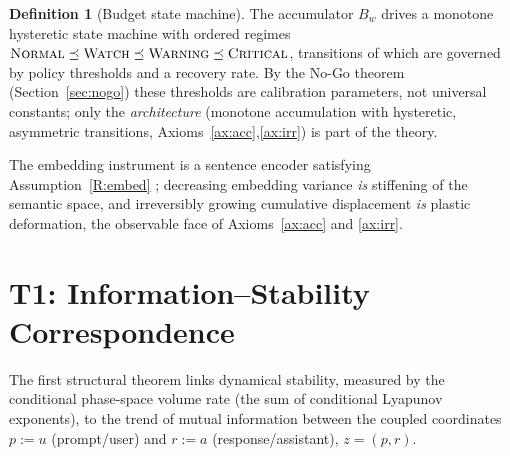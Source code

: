 \documentclass[11pt]{article}
\theoremstyle{plain}
\theoremstyle{definition}
\newtheorem{definition}[theorem]{Definition}
\theoremstyle{remark}
\begin{document}
\begin{definition}[Budget state machine]\label{def:budget}
The accumulator $B_w$ drives a monotone hysteretic state machine with ordered regimes $\textsc{Normal}\preceq\textsc{Watch}\preceq\textsc{Warning}\preceq\textsc{Critical}$, transitions of which are governed by policy thresholds and a recovery rate. By the No-Go theorem (Section~\ref{sec:nogo}) these thresholds are calibration parameters, not universal constants; only the \emph{architecture} (monotone accumulation with hysteretic, asymmetric transitions, Axioms~\ref{ax:acc},\ref{ax:irr}) is part of the theory.
\end{definition}

The embedding instrument is a sentence encoder satisfying Assumption~\ref{R:embed} \citep{reimers2019}; decreasing embedding variance \emph{is} stiffening of the semantic space, and irreversibly growing cumulative displacement \emph{is} plastic deformation, the observable face of Axioms~\ref{ax:acc} and \ref{ax:irr}.

\section{T1: Information--Stability Correspondence}\label{sec:t1}

The first structural theorem links dynamical stability, measured by the conditional phase-space volume rate (the sum of conditional Lyapunov exponents), to the trend of mutual information between the coupled coordinates $p:=u$ (prompt/user) and $r:=a$ (response/assistant), $z=(p,r)$.
\end{document}
